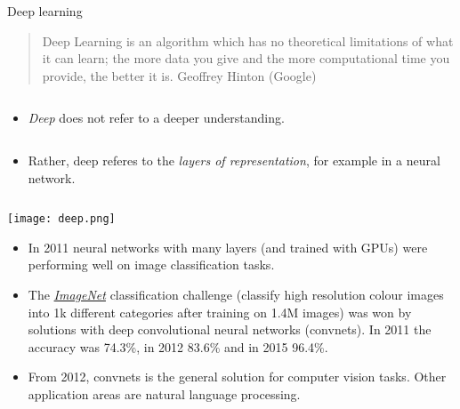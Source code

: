 \documentclass[
  10pt,
  ignorenonframetext,
]{beamer}
\providecommand{\tightlist}{%
  \setlength{\itemsep}{0pt}\setlength{\parskip}{0pt}}
\begin{document}
\begin{frame}
\begin{block}{Deep learning}
\protect\hypertarget{deep-learning}{}
\(~\)

\begin{quote}
Deep Learning is an algorithm which has no theoretical limitations of what it can learn; the more data you give and the more computational time you provide, the better it is. Geoffrey Hinton (Google)
\end{quote}

\(~\)

\begin{itemize}
\tightlist
\item
  \emph{Deep} does not refer to a deeper understanding.
\end{itemize}

\(~\)

\begin{itemize}
\tightlist
\item
  Rather, deep referes to the \emph{layers of representation}, for
  example in a neural network.
\end{itemize}

\(~\)

\center

\texttt{[image: deep.png]}
\end{block}
\end{frame}

\begin{frame}
\begin{itemize}
\tightlist
\item
  In 2011 neural networks with many layers (and trained with GPUs) were
  performing well on image classification tasks.
\end{itemize}

\vspace{2mm}

\begin{itemize}
\tightlist
\item
  The \href{http://www.image-net.org/}{\emph{ImageNet}} classification
  challenge (classify high resolution colour images into 1k different
  categories after training on 1.4M images) was won by solutions with
  deep convolutional neural networks (convnets). In 2011 the accuracy
  was 74.3\%, in 2012 83.6\% and in 2015 96.4\%.
\end{itemize}

\vspace{2mm}

\begin{itemize}
\tightlist
\item
  From 2012, convnets is the general solution for computer vision tasks.
  Other application areas are natural language processing.
\end{itemize}
\end{frame}
\end{document}
